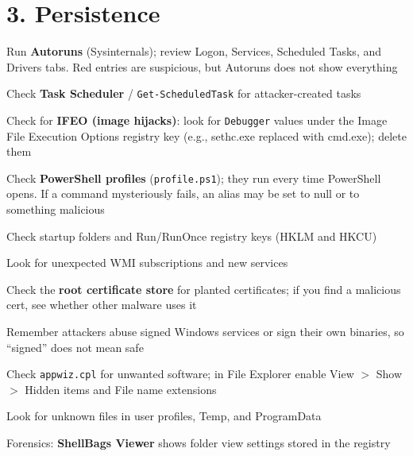 \documentclass[11pt]{article}
\newcommand{\cmd}[1]{\texttt{\small #1}}
\begin{document}
\section*{3. Persistence}
\begin{mycheck}
  \item Run \textbf{Autoruns} (Sysinternals); review Logon, Services, Scheduled Tasks, and Drivers tabs. Red entries are suspicious, but Autoruns does not show everything
  \item Check \textbf{Task Scheduler} / \cmd{Get-ScheduledTask} for attacker-created tasks
  \item Check for \textbf{IFEO (image hijacks)}: look for \cmd{Debugger} values under the Image File Execution Options registry key (e.g., sethc.exe replaced with cmd.exe); delete them
  \item Check \textbf{PowerShell profiles} (\cmd{profile.ps1}); they run every time PowerShell opens. If a command mysteriously fails, an alias may be set to null or to something malicious
  \item Check startup folders and Run/RunOnce registry keys (HKLM and HKCU)
  \item Look for unexpected WMI subscriptions and new services
  \item Check the \textbf{root certificate store} for planted certificates; if you find a malicious cert, see whether other malware uses it
  \item Remember attackers abuse signed Windows services or sign their own binaries, so ``signed'' does not mean safe
  \item Check \cmd{appwiz.cpl} for unwanted software; in File Explorer enable View $>$ Show $>$ Hidden items and File name extensions
  \item Look for unknown files in user profiles, Temp, and ProgramData
  \item Forensics: \textbf{ShellBags Viewer} shows folder view settings stored in the registry
\end{mycheck}
\end{document}
